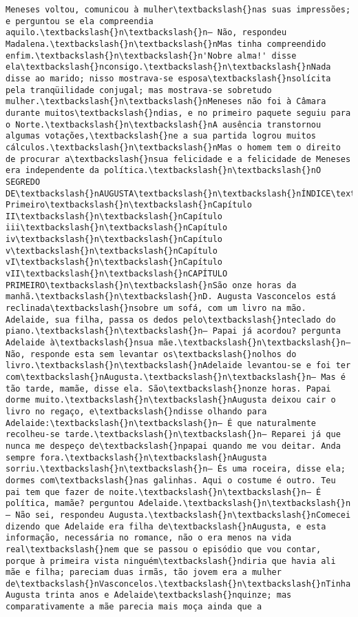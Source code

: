 \begin{Verbatim}[commandchars=\\\{\}]
Meneses voltou, comunicou à mulher\textbackslash{}nas suas impressões; e perguntou se ela compreendia aquilo.\textbackslash{}n\textbackslash{}n— Não, respondeu Madalena.\textbackslash{}n\textbackslash{}nMas tinha compreendido enfim.\textbackslash{}n\textbackslash{}n'Nobre alma!' disse ela\textbackslash{}nconsigo.\textbackslash{}n\textbackslash{}nNada disse ao marido; nisso mostrava-se esposa\textbackslash{}nsolícita pela tranqüilidade conjugal; mas mostrava-se sobretudo mulher.\textbackslash{}n\textbackslash{}nMeneses não foi à Câmara durante muitos\textbackslash{}ndias, e no primeiro paquete seguiu para o Norte.\textbackslash{}n\textbackslash{}nA ausência transtornou algumas votações,\textbackslash{}ne a sua partida logrou muitos cálculos.\textbackslash{}n\textbackslash{}nMas o homem tem o direito de procurar a\textbackslash{}nsua felicidade e a felicidade de Meneses era independente da política.\textbackslash{}n\textbackslash{}nO SEGREDO DE\textbackslash{}nAUGUSTA\textbackslash{}n\textbackslash{}nÍNDICE\textbackslash{}n\textbackslash{}nCapítulo Primeiro\textbackslash{}n\textbackslash{}nCapítulo II\textbackslash{}n\textbackslash{}nCapítulo iii\textbackslash{}n\textbackslash{}nCapítulo iv\textbackslash{}n\textbackslash{}nCapítulo v\textbackslash{}n\textbackslash{}nCapítulo vI\textbackslash{}n\textbackslash{}nCapítulo vII\textbackslash{}n\textbackslash{}nCAPÍTULO PRIMEIRO\textbackslash{}n\textbackslash{}nSão onze horas da manhã.\textbackslash{}n\textbackslash{}nD. Augusta Vasconcelos está reclinada\textbackslash{}nsobre um sofá, com um livro na mão. Adelaide, sua filha, passa os dedos pelo\textbackslash{}nteclado do piano.\textbackslash{}n\textbackslash{}n— Papai já acordou? pergunta Adelaide à\textbackslash{}nsua mãe.\textbackslash{}n\textbackslash{}n— Não, responde esta sem levantar os\textbackslash{}nolhos do livro.\textbackslash{}n\textbackslash{}nAdelaide levantou-se e foi ter com\textbackslash{}nAugusta.\textbackslash{}n\textbackslash{}n— Mas é tão tarde, mamãe, disse ela. São\textbackslash{}nonze horas. Papai dorme muito.\textbackslash{}n\textbackslash{}nAugusta deixou cair o livro no regaço, e\textbackslash{}ndisse olhando para Adelaide:\textbackslash{}n\textbackslash{}n— É que naturalmente recolheu-se tarde.\textbackslash{}n\textbackslash{}n— Reparei já que nunca me despeço de\textbackslash{}npapai quando me vou deitar. Anda sempre fora.\textbackslash{}n\textbackslash{}nAugusta sorriu.\textbackslash{}n\textbackslash{}n— És uma roceira, disse ela; dormes com\textbackslash{}nas galinhas. Aqui o costume é outro. Teu pai tem que fazer de noite.\textbackslash{}n\textbackslash{}n— É política, mamãe? perguntou Adelaide.\textbackslash{}n\textbackslash{}n— Não sei, respondeu Augusta.\textbackslash{}n\textbackslash{}nComecei dizendo que Adelaide era filha de\textbackslash{}nAugusta, e esta informação, necessária no romance, não o era menos na vida real\textbackslash{}nem que se passou o episódio que vou contar, porque à primeira vista ninguém\textbackslash{}ndiria que havia ali mãe e filha; pareciam duas irmãs, tão jovem era a mulher de\textbackslash{}nVasconcelos.\textbackslash{}n\textbackslash{}nTinha Augusta trinta anos e Adelaide\textbackslash{}nquinze; mas comparativamente a mãe parecia mais moça ainda que a 
\end{Verbatim}
